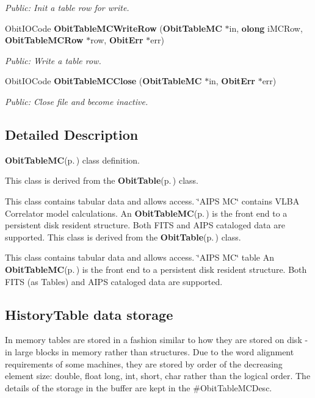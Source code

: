 \begin{CompactItemize}
\begin{CompactList}\small\item\em Public: Init a table row for write. \item\end{CompactList}\item 
Obit\-IOCode {\bf Obit\-Table\-MCWrite\-Row} ({\bf Obit\-Table\-MC} $\ast$in, {\bf olong} i\-MCRow, {\bf Obit\-Table\-MCRow} $\ast$row, {\bf Obit\-Err} $\ast$err)
\begin{CompactList}\small\item\em Public: Write a table row. \item\end{CompactList}\item 
Obit\-IOCode {\bf Obit\-Table\-MCClose} ({\bf Obit\-Table\-MC} $\ast$in, {\bf Obit\-Err} $\ast$err)
\begin{CompactList}\small\item\em Public: Close file and become inactive. \item\end{CompactList}\end{CompactItemize}


\subsection{Detailed Description}
{\bf Obit\-Table\-MC}{\rm (p.\,\pageref{structObitTableMC})} class definition. 

This class is derived from the {\bf Obit\-Table}{\rm (p.\,\pageref{structObitTable})} class.

This class contains tabular data and allows access. \char`\"{}AIPS MC\char`\"{} contains VLBA Correlator model calculations. An {\bf Obit\-Table\-MC}{\rm (p.\,\pageref{structObitTableMC})} is the front end to a persistent disk resident structure. Both FITS and AIPS cataloged data are supported. This class is derived from the {\bf Obit\-Table}{\rm (p.\,\pageref{structObitTable})} class.

This class contains tabular data and allows access. \char`\"{}AIPS MC\char`\"{} table An {\bf Obit\-Table\-MC}{\rm (p.\,\pageref{structObitTableMC})} is the front end to a persistent disk resident structure. Both FITS (as Tables) and AIPS cataloged data are supported.\subsection{History\-Table data storage}\label{ObitTableWX_8h_TableDataStorage}
In memory tables are stored in a fashion similar to how they are stored on disk - in large blocks in memory rather than structures. Due to the word alignment requirements of some machines, they are stored by order of the decreasing element size: double, float long, int, short, char rather than the logical order. The details of the storage in the buffer are kept in the \#Obit\-Table\-MCDesc.

